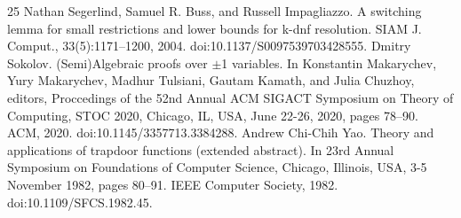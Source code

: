 \documentclass[10pt,a4paper]{article}
\begin{document}
\begin{thebibliography}{25}
 Nathan Segerlind, Samuel R. Buss, and Russell Impagliazzo. A switching lemma for small restrictions and lower bounds for k-dnf resolution. SIAM J. Comput., 33(5):1171–1200, 2004. doi:10.1137/S0097539703428555.
 Dmitry Sokolov. (Semi)Algebraic proofs over $\pm$1 variables. In Konstantin Makarychev, Yury Makarychev, Madhur Tulsiani, Gautam Kamath, and Julia Chuzhoy, editors, Proccedings of the 52nd Annual ACM SIGACT Symposium on Theory of Computing, STOC 2020, Chicago, IL, USA, June 22-26, 2020, pages 78–90. ACM, 2020. doi:10.1145/3357713.3384288.
 Andrew Chi-Chih Yao. Theory and applications of trapdoor functions (extended abstract). In 23rd Annual Symposium on Foundations of Computer Science, Chicago, Illinois, USA, 3-5 November 1982, pages 80–91. IEEE Computer Society, 1982. doi:10.1109/SFCS.1982.45.
\end{thebibliography}
\end{document}
